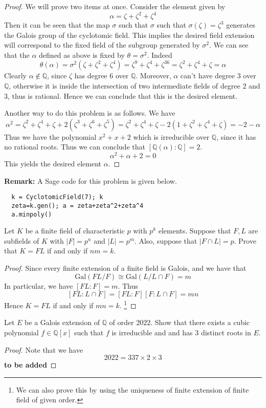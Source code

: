 \documentclass[11pt,letterpaper]{article}
\newcounter{problem}
\DeclareMathOperator{\1}{\mathbbm{1}}
\begin{document}
\begin{proof}
  We will prove two items at once. Consider the element given by
  \[\alpha = \zeta + \zeta^2+\zeta^4\]
  Then it can be seen that the map $\sigma$ such that $\sigma$ such that $\sigma(\zeta) = \zeta^3$ generates the Galois group of the cyclotomic field. This implies the desired field extension will correspond
  to the fixed field of the subgroup generated by $\sigma^2$. We can see that the $\alpha$ defined as above
  is fixed by $\theta=\sigma^2$. Indeed
  \[\theta(\alpha) = \sigma^2(\zeta + \zeta^2+\zeta^4) = \zeta^9 + \zeta^4+\zeta^{36} = \zeta^2 + \zeta^4+\zeta = \alpha\]
  Clearly $\alpha \notin \mathbb{Q}$, since $\zeta$ has degree $6$ over $\mathbb{Q}$. Moreover, $\alpha$ can't have degree $3$ over $\mathbb{Q}$,
  otherwise it is inside the intersection of two intermediate fields of degree $2$ and $3$, thus is rational.
  Hence we can conclude that this is the desired element.

  Another way  to do this problem is as follows. We have
  \[\alpha^2 = \zeta^2+\zeta^4+\zeta + 2(\zeta^3+\zeta^6+\zeta^5)=\zeta^2+\zeta^4+\zeta-2(1+\zeta^2+\zeta^4+\zeta)=-2-\alpha\]
  Thus we have the polynomial $x^2+x+2$ which is irreducible over $\mathbb{Q}$, since it has no rational roots. Thus we can conclude that $[\mathbb{Q}(\alpha):\mathbb{Q}] = 2$.
  \[\alpha^2 + \alpha + 2 = 0\]
  This yields the desired element $\alpha$.
\end{proof}
\textbf{Remark:} A Sage code for this problem is given below.
\begin{verbatim}
  k = CyclotomicField(7); k 
  zeta=k.gen(); a = zeta+zeta^2+zeta^4
  a.minpoly()
\end{verbatim}
\begin{exercise}
  Let \( K \) be a finite field of characteristic \( p \) with \( p^k \) elements. Suppose that \( F, L \) are subfields of \( K \) with \( |F| = p^n \) and \( |L| = p^m \). Also, suppose that \( |F \cap L| = p \). Prove that \( K = FL \) if and only if \( nm = k \).
\end{exercise}
\begin{proof}
  Since every finite extension of a finite field is Galois, and we have that
  \[\text{Gal}(FL/F) \cong \text{Gal}(L/L\cap F) = m\]
  In particular, we have $[FL:F] = m$. Thus
  \[[FL:L \cap F] = [FL:F][F:L\cap F ] = mn\]
  Hence $K = FL$ if and only if $mn = k$.  \footnote{  We can also prove this by using the uniqueness of finite extension of finite field of given order.}
\end{proof}
\begin{exercise}
  Let $E$ be a Galois extension of $\mathbb{Q}$ of order $2022$. Show that there exists 
  a cubic polynomial $f \in \mathbb{Q}[x]$ such that $f$ is irreducible and and has 3 distinct roots in $E$.
\end{exercise}
\begin{proof}
Note that we have 
\[2022 = 337 \times 2 \times 3\]
\textbf{to be added}
\end{proof}
\end{document}

